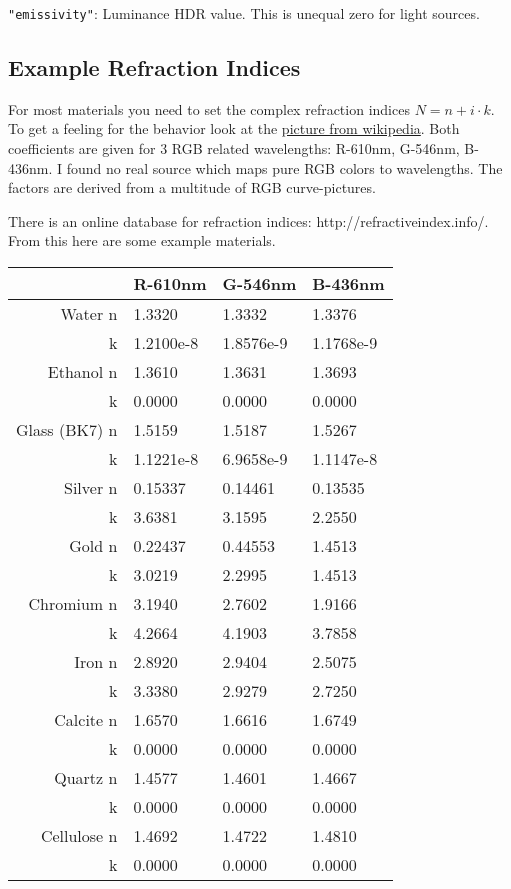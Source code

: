 \documentclass[english,10pt,a4paper,twocolumn,colorscheme=green]{orarticle}
\begin{document}
	\lstinline|"emissivity"|: Luminance HDR value. This is unequal zero for light sources.
	
	\subsection{Example Refraction Indices}
	For most materials you need to set the complex refraction indices $N = n + i \cdot k$. To get a feeling for the behavior look at the \href{	http://de.wikipedia.org/wiki/Fresnelsche\_Formeln\#mediaviewer/File:Fresnel\_reflection\_coefficients\_\%28DE\%29.svg}{picture from wikipedia}. Both coefficients are given for 3 RGB related wavelengths: R-610nm, G-546nm, B-436nm. I found no real source which maps pure RGB colors to wavelengths. The factors are derived from a multitude of RGB curve-pictures.
	
	There is an online database for refraction indices: http://refractiveindex.info/.
	From this here are some example materials.
	
	\begin{tabular}{|r|l|l|l|}
		\hline
		& R-610nm & G-546nm & B-436nm\\
		\hline
		Water n & 1.3320 & 1.3332 & 1.3376\\
		k & 1.2100e-8 & 1.8576e-9 & 1.1768e-9\\
		\hline
		Ethanol n & 1.3610 & 1.3631 & 1.3693\\
		k & 0.0000 & 0.0000 & 0.0000\\
		\hline
		Glass (BK7) n & 1.5159 & 1.5187 & 1.5267\\
		k & 1.1221e-8 & 6.9658e-9 & 1.1147e-8\\
		\hline
		Silver n & 0.15337 & 0.14461 & 0.13535\\
		k & 3.6381 & 3.1595 & 2.2550\\
		\hline
		Gold n & 0.22437 & 0.44553 & 1.4513\\
		k & 3.0219 & 2.2995 & 1.4513\\
		\hline
		Chromium n & 3.1940 & 2.7602 & 1.9166\\
		k & 4.2664 & 4.1903 & 3.7858\\
		\hline
		Iron n & 2.8920 & 2.9404 & 2.5075\\
		k & 3.3380 & 2.9279 & 2.7250\\
		\hline
		Calcite n & 1.6570 & 1.6616 & 1.6749\\
		k & 0.0000 & 0.0000 & 0.0000\\
		\hline
		Quartz n & 1.4577 & 1.4601 & 1.4667\\
		k & 0.0000 & 0.0000 & 0.0000\\
		\hline
		Cellulose n & 1.4692 & 1.4722 & 1.4810\\
		k & 0.0000 & 0.0000 & 0.0000\\
		\hline
	\end{tabular}
	
\end{document}
